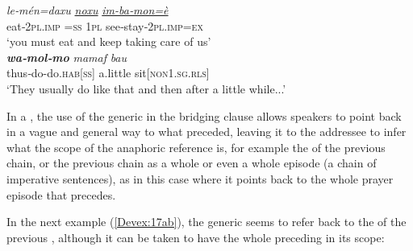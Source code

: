 \documentclass[output=paper]{LSP/langsci}
\begin{document}
	     
\begin{exe}
\ex \label{Devex:16ab}
\begin{xlist}
\ex \label{Devex:16a}			     
\gll \textit{le‑mén=daxu}  \underline{\textit{noxu}} \underline{\textit{im-ba‑mon=è}}\\
eat‑\textsc{2pl.imp =ss} \textsc{1pl} see‑stay‑\textsc{2pl.imp=ex}\\
\glt `you must eat and keep taking care of us'\\
 
\ex \label{Devex:16b}			     
\gll \textbf{\textit{wa‑mol‑mo}} \textit{mamaf} \textit{bau}\\    
thus‑do-do.\textsc{hab[ss]} a.little sit[\textsc{non1.sg.rls}]\\	
\glt `They usually do like that and then after a little while...'\\
\end{xlist}
\end{exe}
		
In a , the use of the generic  in the bridging clause allows speakers to point back in a vague  and general way to what preceded, leaving it to the addressee to infer what the scope of the anaphoric reference is, for example the  of the previous chain, or the previous chain as a whole or even  a whole episode (a chain of imperative sentences),  as in this case where it points back to the whole prayer episode that precedes.

In the next example (\ref{Devex:17ab}), the generic  seems to refer back to the  of the previous , although it can be taken to have the whole preceding  in its scope:
	
\end{document}

